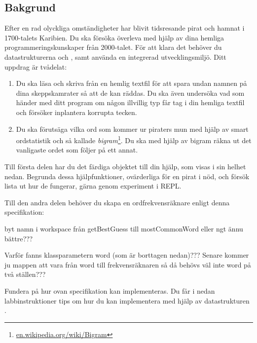 \subsection{Bakgrund}


Efter en rad olyckliga omständigheter har blivit tidsresande pirat och hamnat i 1700-talets Karibien. Du ska försöka överleva med hjälp av dina hemliga programmeringskunskaper från 2000-talet. För att klara det behöver du datastrukturerna  och , samt använda en integrerad utvecklingsmiljö.
Ditt uppdrag är tvådelat:
\begin{enumerate}
\item Du ska läsa och skriva från en hemlig textfil för att spara undan namnen på dina skeppskamrater så att de kan räddas. Du ska även undersöka vad som händer med ditt program om någon illvillig typ får tag i din hemliga textfil och försöker inplantera korrupta tecken.
\item Du ska förutsäga vilka ord som kommer ur piraters mun med hjälp av smart ordstatistik och så kallade \emph{bigram}\footnote{\href{https://en.wikipedia.org/wiki/Bigram}{en.wikipedia.org/wiki/Bigram}}. Du ska med hjälp av bigram räkna ut det vanligaste ordet som följer på ett annat.  
\end{enumerate}


Till första delen har du det färdiga objektet  till din hjälp, som visas i sin helhet nedan. Begrunda dessa hjälpfunktioner, ovärderliga för en pirat i nöd, och försök lista ut hur de fungerar, gärna genom experiment i REPL.

\noindent Till den andra delen behöver du skapa en ordfrekvensräknare enligt denna specifikation: 

\TODO byt namn i workspace från getBestGuess till mostCommonWord eller ngt ännu bättre???  

\TODO Varför fanns klassparametern word (som är borttagen nedan)??? Senare kommer ju mappen att vara från word till frekvensräknaren så då behövs väl inte word på två ställen???


%    
%    
%    
\noindent Fundera på hur ovan specifikation kan implementeras. Du får i nedan labbinstruktioner tips om hur du kan implementera  med hjälp av datastrukturen .

